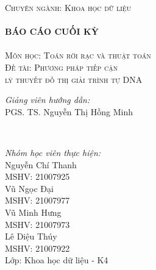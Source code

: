 \documentclass[14pt, a4paper]{article}
\numberwithin{equation}{section}
\numberwithin{figure}{section}
\numberwithin{dl}{section}
\numberwithin{md}{section}
\numberwithin{bd}{section}
\numberwithin{dn}{section}
\numberwithin{hq}{section}
\begin{document}
\begin{titlepage}
        \textsc{\Large Chuyên ngành: Khoa học dữ liệu}\\[0.5cm] %



        \HRule \\[0.4cm]
        { \huge \bfseries BÁO CÁO CUỐI KỲ}\\[0.4cm] %
        \HRule \\[1.5cm]

        \textsc{\Large Môn học: Toán rời rạc và thuật toán}\\[1cm] %


        \textsc{\Large Đề tài: Phương pháp tiếp cận \\ lý thuyết đồ thị giải trình tự DNA}\\[1cm]


        \begin{minipage}{0.4\textwidth}
            \begin{flushleft} \large
            \emph{Giảng viên hướng dẫn:} \\
            PGS. TS. Nguyễn Thị Hồng Minh %
            \end{flushleft}
        \end{minipage}\\[0.5cm]

        \begin{minipage}{0.4\textwidth}
        \begin{flushleft} \large
        \emph{Nhóm học viên thực hiện:}\\
        Nguyễn Chí Thanh \\
        MSHV: 21007925 \\ %
        Vũ Ngọc Đại \\
        MSHV: 21007977 \\
        Vũ Minh Hưng \\
        MSHV: 21007973 \\
        Lê Diệu Thúy \\
        MSHV: 21007922 \\
        Lớp: Khoa học dữ liệu - K4
        \end{flushleft}
        \end{minipage}



\end{titlepage}
\end{document}
